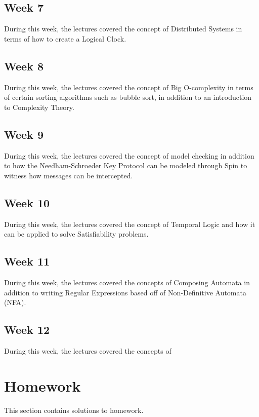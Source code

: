 \documentclass{article}
\theoremstyle{theorem}
\theoremstyle{definition}
\theoremstyle{remark}
\begin{document}
\subsection{Week 7} During this week, the lectures covered the concept of Distributed Systems in terms of how to create a Logical Clock.
\subsection{Week 8} During this week, the lectures covered the concept of Big O-complexity in terms of certain sorting algorithms such as bubble sort, in addition to an introduction to Complexity Theory.
\subsection{Week 9} During this week, the lectures covered the concept of model checking in addition to how the Needham-Schroeder Key Protocol can be modeled through Spin to witness how messages can be intercepted.
\subsection{Week 10} During this week, the lectures covered the concept of Temporal Logic and how it can be applied to solve Satisfiability problems.
\subsection{Week 11} During this week, the lectures covered the concepts of Composing Automata in addition to writing Regular Expressions based off of Non-Definitive Automata (NFA).
\subsection{Week 12} During this week, the lectures covered the concepts of 
\section{Homework}\label{homework}

This section contains solutions to homework. 
\end{document}
